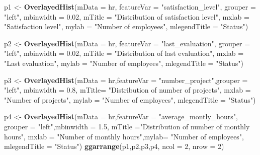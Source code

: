 \documentclass[
  11pt,
]{article}
\newenvironment{Shaded}{\begin{snugshade}}{\end{snugshade}}
\newcommand{\AttributeTok}[1]{\textcolor[rgb]{0.13,0.29,0.53}{#1}}
\newcommand{\DecValTok}[1]{\textcolor[rgb]{0.00,0.00,0.81}{#1}}
\newcommand{\FloatTok}[1]{\textcolor[rgb]{0.00,0.00,0.81}{#1}}
\newcommand{\FunctionTok}[1]{\textcolor[rgb]{0.13,0.29,0.53}{\textbf{#1}}}
\newcommand{\NormalTok}[1]{#1}
\newcommand{\OtherTok}[1]{\textcolor[rgb]{0.56,0.35,0.01}{#1}}
\newcommand{\StringTok}[1]{\textcolor[rgb]{0.31,0.60,0.02}{#1}}
\begin{document}
\begin{Shaded}
\begin{Highlighting}[]
\NormalTok{p1 }\OtherTok{\textless{}{-}} \FunctionTok{OverlayedHist}\NormalTok{(}\AttributeTok{mData =}\NormalTok{ hr, }\AttributeTok{featureVar =} \StringTok{"satisfaction\_level"}\NormalTok{, }
                    \AttributeTok{grouper =} \StringTok{"left"}\NormalTok{, }\AttributeTok{mbinwidth    =}  \FloatTok{0.02}\NormalTok{,}
                    \AttributeTok{mTitle =} \StringTok{"Distribution of satisfaction level"}\NormalTok{,}
                    \AttributeTok{mxlab  =} \StringTok{"Satisfaction level"}\NormalTok{, }\AttributeTok{mylab =} \StringTok{"Number of employees"}\NormalTok{,}
                    \AttributeTok{mlegendTitle =} \StringTok{"Status"}\NormalTok{)}

\NormalTok{p2 }\OtherTok{\textless{}{-}} \FunctionTok{OverlayedHist}\NormalTok{(}\AttributeTok{mData =}\NormalTok{ hr, }\AttributeTok{featureVar  =} \StringTok{"last\_evaluation"}\NormalTok{,}
                    \AttributeTok{grouper =} \StringTok{"left"}\NormalTok{, }\AttributeTok{mbinwidth    =}  \FloatTok{0.02}\NormalTok{,}
                    \AttributeTok{mTitle  =} \StringTok{"Distribution of last evaluation"}\NormalTok{,}
                    \AttributeTok{mxlab   =} \StringTok{"Last evaluation"}\NormalTok{, }\AttributeTok{mylab  =} \StringTok{"Number of employees"}\NormalTok{,}
                    \AttributeTok{mlegendTitle =} \StringTok{"Status"}\NormalTok{)}

\NormalTok{p3 }\OtherTok{\textless{}{-}} \FunctionTok{OverlayedHist}\NormalTok{(}\AttributeTok{mData =}\NormalTok{ hr,}\AttributeTok{featureVar   =} \StringTok{"number\_project"}\NormalTok{,}\AttributeTok{grouper =} \StringTok{"left"}\NormalTok{,}
                    \AttributeTok{mbinwidth =} \FloatTok{0.8}\NormalTok{, }\AttributeTok{mTitle=} \StringTok{"Distribution of number of projects"}\NormalTok{,}
                    \AttributeTok{mxlab =} \StringTok{"Number of projects"}\NormalTok{, }\AttributeTok{mylab =} \StringTok{"Number of employees"}\NormalTok{,}
                    \AttributeTok{mlegendTitle =} \StringTok{"Status"}\NormalTok{)}

\NormalTok{p4 }\OtherTok{\textless{}{-}} \FunctionTok{OverlayedHist}\NormalTok{(}\AttributeTok{mData =}\NormalTok{ hr,}\AttributeTok{featureVar   =} \StringTok{"average\_montly\_hours"}\NormalTok{,}
                    \AttributeTok{grouper =} \StringTok{"left"}\NormalTok{,}\AttributeTok{mbinwidth    =}  \FloatTok{1.5}\NormalTok{,}
                    \AttributeTok{mTitle =}\StringTok{"Distribution of number of monthly hours"}\NormalTok{,}
                    \AttributeTok{mxlab =} \StringTok{"Number of monthly hours"}\NormalTok{,}\AttributeTok{mylab=} \StringTok{"Number of employees"}\NormalTok{,}
                    \AttributeTok{mlegendTitle =} \StringTok{"Status"}\NormalTok{)}
\FunctionTok{ggarrange}\NormalTok{(p1,p2,p3,p4, }\AttributeTok{ncol =} \DecValTok{2}\NormalTok{, }\AttributeTok{nrow =} \DecValTok{2}\NormalTok{)}
\end{Highlighting}
\end{Shaded}
\end{document}
